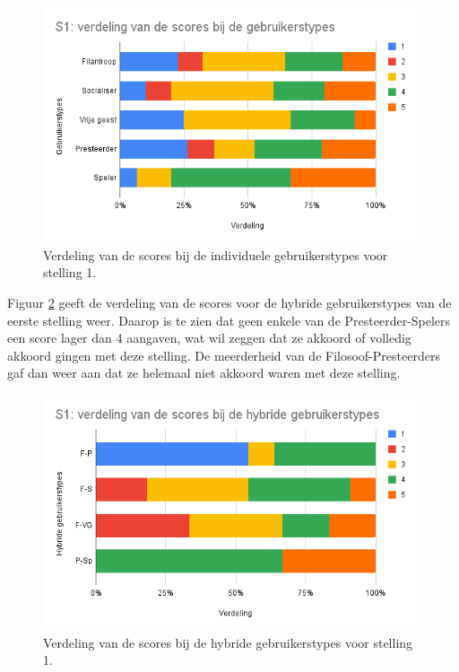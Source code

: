 \begin{figure}
    \includegraphics[width=\linewidth]{S1.png}
    \caption{Verdeling van de scores bij de individuele gebruikerstypes voor stelling 1.}
    \label{fig:s1}
\end{figure}

Figuur \ref{fig:s1_hybride} geeft de verdeling van de scores voor de hybride gebruikerstypes van de eerste stelling weer. Daarop is te zien dat geen enkele van de Presteerder-Spelers een score lager dan 4 aangaven, wat wil zeggen dat ze akkoord of volledig akkoord gingen met deze stelling. De meerderheid van de Filosoof-Presteerders gaf dan weer aan dat ze helemaal niet akkoord waren met deze stelling.

\begin{figure}
    \includegraphics[width=\linewidth]{S1_Hybride.png}
    \caption{Verdeling van de scores bij de hybride gebruikerstypes voor stelling 1.}
    \label{fig:s1_hybride}
\end{figure}

